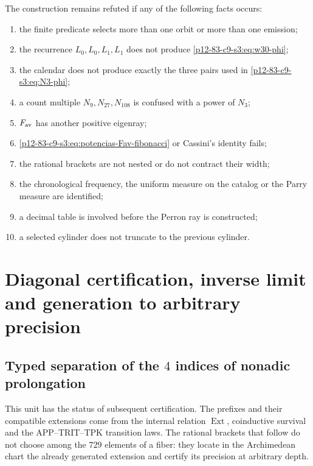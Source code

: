 \begin{criterion}
The construction remains refuted if any of the following facts
occurs:
\begin{enumerate}
 \item the finite predicate selects more than one orbit or more than one emission;
 \item the recurrence \(L_0,L_0,L_1,L_1\) does not produce
       \eqref{p12-83-c9-s3:eq:w30-phi};
 \item the calendar does not produce exactly the three pairs used in
       \eqref{p12-83-c9-s3:eq:N3-phi};
 \item a count multiple \(N_{9},N_{27},N_{108}\) is confused with a
       power of \(N_3\);
 \item \(F_{\rm av}\) has another positive eigenray;
 \item \eqref{p12-83-c9-s3:eq:potencias-Fav-fibonacci} or Cassini’s identity fails;
 \item the rational brackets are not nested or do not contract their width;
 \item the chronological frequency, the uniform measure on the
       catalog or the Parry measure are identified;
 \item a decimal table is involved before the Perron ray is constructed;
 \item a selected cylinder does not truncate to the previous cylinder.
\end{enumerate}
\end{criterion}



\section{Diagonal certification, inverse limit and generation to arbitrary precision}
\label{p12-83-c9-s4:chap:precision-arbitraria-constantes}

\subsection{Typed separation of the \(4\) indices of nonadic prolongation}

This unit has the status of subsequent certification. The prefixes and their
compatible extensions come from the internal relation
\(\operatorname{Ext}\), coinductive survival and the APP--TRIT--TPK
transition laws. The rational brackets that follow do not choose
among the \(729\) elements of a fiber: they locate in the Archimedean chart
the already generated extension and certify its precision at arbitrary depth.

